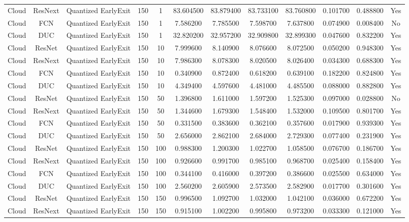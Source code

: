 \begin{tabular}{|c||c||c||c||c||c||c||c||c||c||c||c|}
Cloud & ResNext & Quantized EarlyExit & 150 & 1 & 83.604500 & 83.879400 & 83.733100 & 83.760800 & 0.101700 & 0.488800 & Yes \\
Cloud & FCN & Quantized EarlyExit & 150 & 1 & 7.586200 & 7.785500 & 7.598700 & 7.637800 & 0.074900 & 0.008400 & No \\
Cloud & DUC & Quantized EarlyExit & 150 & 1 & 32.820200 & 32.957200 & 32.909800 & 32.899300 & 0.047600 & 0.832200 & Yes \\
Cloud & ResNet & Quantized EarlyExit & 150 & 10 & 7.999600 & 8.140900 & 8.076600 & 8.072500 & 0.050200 & 0.948300 & Yes \\
Cloud & ResNext & Quantized EarlyExit & 150 & 10 & 7.986300 & 8.078300 & 8.020500 & 8.026400 & 0.034300 & 0.688300 & Yes \\
Cloud & FCN & Quantized EarlyExit & 150 & 10 & 0.340900 & 0.872400 & 0.618200 & 0.639100 & 0.182200 & 0.824800 & Yes \\
Cloud & DUC & Quantized EarlyExit & 150 & 10 & 4.349400 & 4.597600 & 4.481000 & 4.485500 & 0.088000 & 0.882800 & Yes \\
Cloud & ResNet & Quantized EarlyExit & 150 & 50 & 1.396800 & 1.611000 & 1.597200 & 1.525300 & 0.097000 & 0.028800 & No \\
Cloud & ResNext & Quantized EarlyExit & 150 & 50 & 1.344600 & 1.679300 & 1.548400 & 1.532000 & 0.109500 & 0.801700 & Yes \\
Cloud & FCN & Quantized EarlyExit & 150 & 50 & 0.331500 & 0.383600 & 0.362100 & 0.357600 & 0.017900 & 0.939300 & Yes \\
Cloud & DUC & Quantized EarlyExit & 150 & 50 & 2.656000 & 2.862100 & 2.684000 & 2.729300 & 0.077400 & 0.231900 & Yes \\
Cloud & ResNet & Quantized EarlyExit & 150 & 100 & 0.988300 & 1.200300 & 1.022700 & 1.058500 & 0.076700 & 0.186700 & Yes \\
Cloud & ResNext & Quantized EarlyExit & 150 & 100 & 0.926600 & 0.991700 & 0.985100 & 0.968700 & 0.025400 & 0.158400 & Yes \\
Cloud & FCN & Quantized EarlyExit & 150 & 100 & 0.344100 & 0.416000 & 0.397200 & 0.386600 & 0.025500 & 0.634000 & Yes \\
Cloud & DUC & Quantized EarlyExit & 150 & 100 & 2.560200 & 2.605900 & 2.573500 & 2.582900 & 0.017700 & 0.301600 & Yes \\
Cloud & ResNet & Quantized EarlyExit & 150 & 150 & 0.996500 & 1.092700 & 1.032000 & 1.042100 & 0.036000 & 0.672200 & Yes \\
Cloud & ResNext & Quantized EarlyExit & 150 & 150 & 0.915100 & 1.002200 & 0.995800 & 0.973200 & 0.033300 & 0.121000 & Yes \\

\end{tabular}

